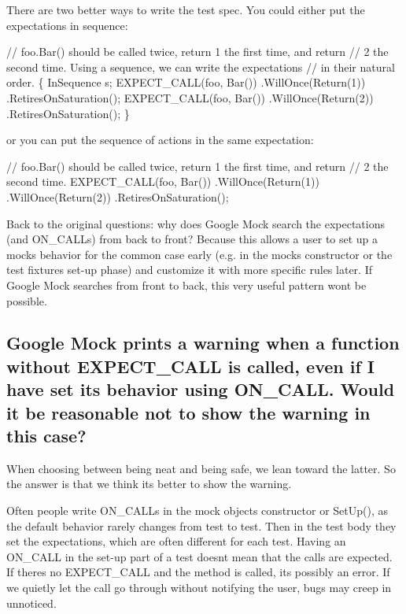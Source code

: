 There are two better ways to write the test spec. You could either put the expectations in sequence\+:


\begin{DoxyCode}
\textcolor{comment}{// foo.Bar() should be called twice, return 1 the first time, and return}
\textcolor{comment}{// 2 the second time.  Using a sequence, we can write the expectations}
\textcolor{comment}{// in their natural order.}
\{
  InSequence s;
  EXPECT\_CALL(foo, Bar())
      .WillOnce(Return(1))
      .RetiresOnSaturation();
  EXPECT\_CALL(foo, Bar())
      .WillOnce(Return(2))
      .RetiresOnSaturation();
\}
\end{DoxyCode}


or you can put the sequence of actions in the same expectation\+:


\begin{DoxyCode}
\textcolor{comment}{// foo.Bar() should be called twice, return 1 the first time, and return}
\textcolor{comment}{// 2 the second time.}
EXPECT\_CALL(foo, Bar())
    .WillOnce(Return(1))
    .WillOnce(Return(2))
    .RetiresOnSaturation();
\end{DoxyCode}


Back to the original questions\+: why does Google Mock search the expectations (and {\ttfamily O\+N\+\_\+\+C\+A\+LL}s) from back to front? Because this allows a user to set up a mock\textquotesingle{}s behavior for the common case early (e.\+g. in the mock\textquotesingle{}s constructor or the test fixture\textquotesingle{}s set-\/up phase) and customize it with more specific rules later. If Google Mock searches from front to back, this very useful pattern won\textquotesingle{}t be possible.

\subsection*{Google Mock prints a warning when a function without E\+X\+P\+E\+C\+T\+\_\+\+C\+A\+LL is called, even if I have set its behavior using O\+N\+\_\+\+C\+A\+LL. Would it be reasonable not to show the warning in this case?}

When choosing between being neat and being safe, we lean toward the latter. So the answer is that we think it\textquotesingle{}s better to show the warning.

Often people write {\ttfamily O\+N\+\_\+\+C\+A\+LL}s in the mock object\textquotesingle{}s constructor or {\ttfamily Set\+Up()}, as the default behavior rarely changes from test to test. Then in the test body they set the expectations, which are often different for each test. Having an {\ttfamily O\+N\+\_\+\+C\+A\+LL} in the set-\/up part of a test doesn\textquotesingle{}t mean that the calls are expected. If there\textquotesingle{}s no {\ttfamily E\+X\+P\+E\+C\+T\+\_\+\+C\+A\+LL} and the method is called, it\textquotesingle{}s possibly an error. If we quietly let the call go through without notifying the user, bugs may creep in unnoticed.


